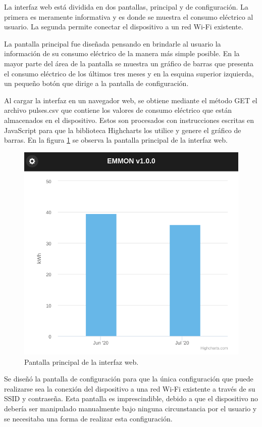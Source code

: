 La interfaz web está dividida en dos pantallas, principal y de configuración. La primera es meramente informativa y es donde se muestra el consumo eléctrico al usuario. La segunda permite conectar el dispositivo a un red Wi-Fi existente.

La pantalla principal fue diseñada pensando en brindarle al usuario la información de su consumo eléctrico de la manera más simple posible. En la mayor parte del área de la pantalla se muestra un gráfico de barras que presenta el consumo eléctrico de los últimos tres meses y en la esquina superior izquierda, un pequeño botón que dirige a la pantalla de configuración.

Al cargar la interfaz en un navegador web, se obtiene mediante el método GET el archivo pulses.csv que contiene los valores de consumo eléctrico que están almacenados en el dispositivo. Estos son procesados con instrucciones escritas en JavaScript para que la biblioteca Highcharts los utilice y genere el gráfico de barras. En la figura \ref{fig:interfaceMain} se observa la pantalla principal de la interfaz web.

\begin{figure}[h]
	\centering
	\includegraphics[scale=0.33]{./Figures/interface_main.png}
	\caption{Pantalla principal de la interfaz web.}
	\label{fig:interfaceMain}
\end{figure}

Se diseñó la pantalla de configuración para que la única configuración que puede realizarse sea la conexión del dispositivo a una red Wi-Fi existente a través de su SSID y contraseña. Esta pantalla es imprescindible, debido a que el dispositivo no debería ser manipulado manualmente bajo ninguna circunstancia por el usuario y se necesitaba una forma de realizar esta configuración.

